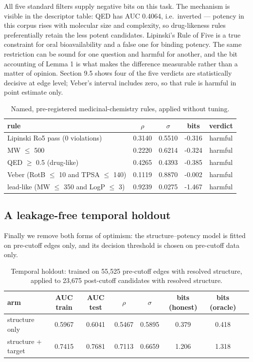 \documentclass[11pt]{article}
\begin{document}
All five standard filters supply negative bits on this task. The mechanism
is visible in the descriptor table: QED has AUC 0.4064, i.e.\ inverted ---
potency in this corpus rises with molecular size and complexity, so
drug-likeness rules preferentially retain the less potent candidates.
Lipinski's Rule of Five \cite{lipinski} is a true constraint for oral
bioavailability and a false one for binding potency. The same restriction
can be sound for one question and harmful for another, and the bit
accounting of Lemma 1 is what makes the difference measurable rather than a
matter of opinion. Section 9.5 shows four of the five verdicts are statistically
decisive at edge level; Veber's interval includes zero, so that rule
is harmful in point estimate only.

\begin{table}[t]
\centering
\caption{Named, pre-registered medicinal-chemistry rules, applied without
tuning.}
\begin{tabular}{lcccc}
\toprule
rule & $\rho$ & $\sigma$ & bits & verdict \\
\midrule
Lipinski Ro5 pass (0 violations) & 0.3140 & 0.5510 & -0.316 & harmful \\
MW $\leq$ 500 & 0.2220 & 0.6214 & -0.324 & harmful \\
QED $\geq$ 0.5 (drug-like) & 0.4265 & 0.4393 & -0.385 & harmful \\
Veber (RotB $\leq$ 10 and TPSA $\leq$ 140) & 0.1119 & 0.8870 & -0.002 & harmful \\
lead-like (MW $\leq$ 350 and LogP $\leq$ 3) & 0.9239 & 0.0275 & -1.467 & harmful \\
\bottomrule
\end{tabular}
\end{table}

\subsection{A leakage-free temporal holdout}

Finally we remove both forms of optimism: the structure--potency model is
fitted on pre-cutoff edges only, and its decision threshold is chosen on
pre-cutoff data only.

\begin{table}[t]
\centering
\caption{Temporal holdout: trained on 55{,}525 pre-cutoff edges with
resolved structure, applied to 23{,}675 post-cutoff candidates with
resolved structure.}
\begin{tabular}{lccccccc}
\toprule
arm & AUC train & AUC test & $\rho$ & $\sigma$ & bits (honest) & bits (oracle) \\
\midrule
structure only & 0.5967 & 0.6041 & 0.5467 & 0.5895 & 0.379 & 0.418 \\
structure + target & 0.7415 & 0.7681 & 0.7113 & 0.6659 & 1.206 & 1.318 \\
\bottomrule
\end{tabular}
\end{table}
\end{document}
